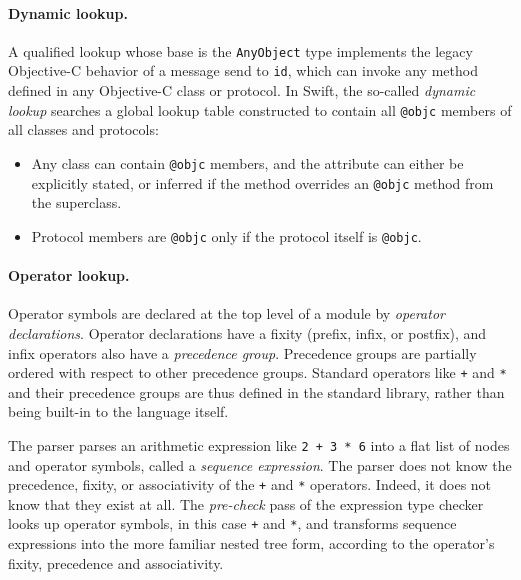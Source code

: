 \documentclass[../generics]{subfiles}
\begin{document}
\paragraph{Dynamic lookup.} A qualified lookup whose base is the \texttt{AnyObject} type implements the legacy Objective-C behavior of a message send to \texttt{id}, which can invoke any method defined in any Objective-C class or protocol. In Swift, the so-called \emph{dynamic lookup} searches a global lookup table constructed to contain all \texttt{@objc} members of all classes and protocols:
\begin{itemize}
\item Any class can contain \texttt{@objc} members, and the attribute can either be explicitly stated, or inferred if the method overrides an \texttt{@objc} method from the superclass.
\item Protocol members are \texttt{@objc} only if the protocol itself is \texttt{@objc}.
\end{itemize}

\paragraph{Operator lookup.}
Operator symbols are declared at the top level of a module by \emph{operator declarations}. Operator declarations have a fixity (prefix, infix, or postfix), and infix operators also have a \emph{precedence group}. Precedence groups are partially ordered with respect to other precedence groups. Standard operators like \texttt{+} and \texttt{*} and their precedence groups are thus defined in the standard library, rather than being built-in to the language itself.

The parser parses an arithmetic expression like \texttt{2 + 3 * 6} into a flat list of nodes and operator symbols, called a \emph{sequence expression}. The parser does not know the precedence, fixity, or associativity of the \texttt{+} and \texttt{*} operators. Indeed, it does not know that they exist at all. The \emph{pre-check} pass of the expression type checker looks up operator symbols, in this case \texttt{+} and \texttt{*}, and transforms sequence expressions into the more familiar nested tree form, according to the operator's fixity, precedence and associativity.
\end{document}
